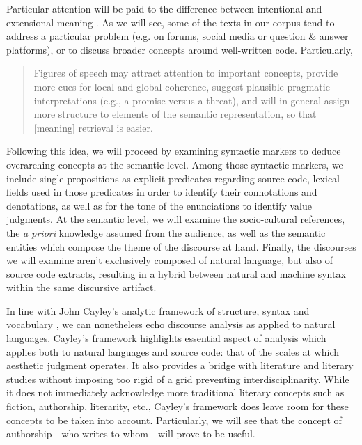 Particular attention will be paid to the difference between intentional and extensional meaning \citep{dijk_strategies_1983}. As we will see, some of the texts in our corpus tend to address a particular problem (e.g. on forums, social media or question \& answer platforms), or to discuss broader concepts around well-written code. Particularly,

\begin{quote}
  Figures of speech may attract attention to important concepts, provide more cues for local and global coherence, suggest plausible pragmatic interpretations (e.g., a promise versus a threat), and will in general assign more structure to elements of the semantic representation, so that [meaning] retrieval is easier. \citep{dijk_strategies_1983}
\end{quote}

Following this idea, we will proceed by examining syntactic markers to deduce overarching concepts at the semantic level. Among those syntactic markers, we include single propositions as explicit predicates regarding source code, lexical fields used in those predicates in order to identify their connotations and denotations, as well as for the tone of the enunciations to identify value judgments. At the semantic level, we will examine the socio-cultural references, the \emph{a priori} knowledge assumed from the audience, as well as the semantic entities which compose the theme of the discourse at hand. Finally, the discourses we will examine aren't exclusively composed of natural language, but also of source code extracts, resulting in a hybrid between natural and machine syntax within the same discursive artifact.

In line with John Cayley's analytic framework of structure, syntax and vocabulary \citep{cayley_code_2012}, we can nonetheless echo discourse analysis as applied to natural languages. Cayley's framework highlights essential aspect of analysis which applies both to natural languages and source code: that of the scales at which aesthetic judgment operates. It also provides a bridge with literature and literary studies without imposing too rigid of a grid preventing interdisciplinarity. While it does not immediately acknowledge more traditional literary concepts such as fiction, authorship, literarity, etc., Cayley's framework does leave room for these concepts to be taken into account. Particularly, we will see that the concept of authorship—who writes to whom—will prove to be useful.

